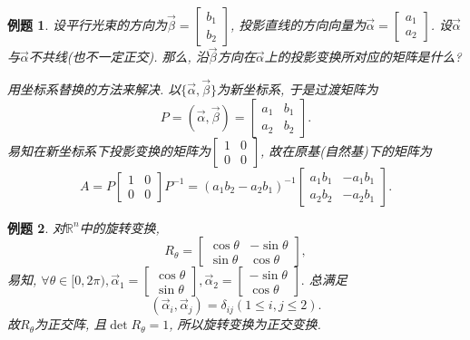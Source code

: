 \documentclass[a4paper]{book}
\newtheorem{eg}{例题}[chapter]
\begin{document}
\begin{eg}
设平行光束的方向为$\vec{\beta}=\begin{bmatrix}b_1\\b_2\end{bmatrix}$, 投影直线的方向向量为$\vec{\alpha}=\begin{bmatrix}a_1\\a_2\end{bmatrix}$. 设$\vec{\alpha}$与$\vec{\alpha}$不共线(也不一定正交). 那么, 沿$\vec{\beta}$方向在$\vec{\alpha}$上的投影变换所对应的矩阵是什么?

用坐标系替换的方法来解决. 以$\{\vec{\alpha},\vec{\beta}\}$为新坐标系, 于是过渡矩阵为
$$P=(\vec{\alpha},\vec{\beta})=\begin{bmatrix}a_1&b_1\\a_2&b_2\end{bmatrix}.$$
易知在新坐标系下投影变换的矩阵为$\begin{bmatrix}1&0\\0&0\end{bmatrix}$, 故在原基(自然基)下的矩阵为
$$A=P\begin{bmatrix}1&0\\0&0\end{bmatrix}P^{-1}=(a_1b_2-a_2b_1)^{-1}\begin{bmatrix}
a_1b_1&-a_1b_1\\a_2b_2&-a_2b_1\end{bmatrix}.$$
\end{eg}

\begin{eg}
对$\mathbb{R}^n$中的旋转变换,
$$R_{\theta}=\begin{bmatrix}\cos\theta&-\sin\theta\\ \sin\theta &\cos\theta\end{bmatrix},$$
易知, $\forall \theta\in [0, 2\pi), \vec{\alpha}_1=\begin{bmatrix} \cos\theta\\ \sin\theta\end{bmatrix}, \vec{\alpha}_2=\begin{bmatrix} -\sin\theta\\ \cos\theta\end{bmatrix}.$ 总满足
$$(\vec{\alpha}_i, \vec{\alpha}_j)=\delta_{ij}(1\leq i, j\leq 2).$$
故$R_{\theta}$为正交阵, 且$\det R_{\theta}=1$, 所以旋转变换为正交变换.
\end{eg}
\end{document}
